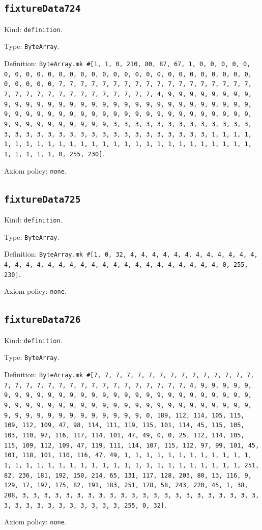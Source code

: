 \documentclass[11pt]{article}
\begin{document}
\subsection*{\texttt{fixtureData724}}
\noindent Kind: \texttt{definition}.\par
\noindent Type: \texttt{ByteArray}.\par
\noindent Definition: \texttt{ByteArray.mk \#[1, 1, 0, 210, 80, 87, 67, 1, 0, 0, 0, 0, 0, 0, 0, 0, 0, 0, 0, 0, 0, 0, 0, 0, 0, 0, 0, 0, 0, 0, 0, 0, 0, 0, 0, 0, 0, 0, 0, 0, 0, 7, 7, 7, 7, 7, 7, 7, 7, 7, 7, 7, 7, 7, 7, 7, 7, 7, 7, 7, 7, 7, 7, 7, 7, 7, 7, 7, 7, 7, 7, 7, 7, 4, 9, 9, 9, 9, 9, 9, 9, 9, 9, 9, 9, 9, 9, 9, 9, 9, 9, 9, 9, 9, 9, 9, 9, 9, 9, 9, 9, 9, 9, 9, 9, 9, 9, 9, 9, 9, 9, 9, 9, 9, 9, 9, 9, 9, 9, 9, 9, 9, 9, 9, 9, 9, 9, 9, 9, 9, 9, 9, 9, 9, 9, 9, 9, 9, 3, 3, 3, 3, 3, 3, 3, 3, 3, 3, 3, 3, 3, 3, 3, 3, 3, 3, 3, 3, 3, 3, 3, 3, 3, 3, 3, 3, 3, 3, 3, 3, 1, 1, 1, 1, 1, 1, 1, 1, 1, 1, 1, 1, 1, 1, 1, 1, 1, 1, 1, 1, 1, 1, 1, 1, 1, 1, 1, 1, 1, 1, 1, 1, 0, 255, 230]}.\par
\noindent Axiom policy: \texttt{none}.\par
\subsection*{\texttt{fixtureData725}}
\noindent Kind: \texttt{definition}.\par
\noindent Type: \texttt{ByteArray}.\par
\noindent Definition: \texttt{ByteArray.mk \#[1, 0, 32, 4, 4, 4, 4, 4, 4, 4, 4, 4, 4, 4, 4, 4, 4, 4, 4, 4, 4, 4, 4, 4, 4, 4, 4, 4, 4, 4, 4, 4, 4, 4, 4, 0, 255, 230]}.\par
\noindent Axiom policy: \texttt{none}.\par
\subsection*{\texttt{fixtureData726}}
\noindent Kind: \texttt{definition}.\par
\noindent Type: \texttt{ByteArray}.\par
\noindent Definition: \texttt{ByteArray.mk \#[7, 7, 7, 7, 7, 7, 7, 7, 7, 7, 7, 7, 7, 7, 7, 7, 7, 7, 7, 7, 7, 7, 7, 7, 7, 7, 7, 7, 7, 7, 7, 7, 4, 9, 9, 9, 9, 9, 9, 9, 9, 9, 9, 9, 9, 9, 9, 9, 9, 9, 9, 9, 9, 9, 9, 9, 9, 9, 9, 9, 9, 9, 9, 9, 9, 9, 9, 9, 9, 9, 9, 9, 9, 9, 9, 9, 9, 9, 9, 9, 9, 9, 9, 9, 9, 9, 9, 9, 9, 9, 9, 9, 9, 9, 9, 9, 9, 0, 189, 112, 114, 105, 115, 109, 112, 109, 47, 98, 114, 111, 119, 115, 101, 114, 45, 115, 105, 103, 110, 97, 116, 117, 114, 101, 47, 49, 0, 0, 25, 112, 114, 105, 115, 109, 112, 109, 47, 119, 111, 114, 107, 115, 112, 97, 99, 101, 45, 101, 118, 101, 110, 116, 47, 49, 1, 1, 1, 1, 1, 1, 1, 1, 1, 1, 1, 1, 1, 1, 1, 1, 1, 1, 1, 1, 1, 1, 1, 1, 1, 1, 1, 1, 1, 1, 1, 1, 1, 1, 251, 82, 236, 181, 192, 150, 214, 65, 131, 117, 128, 203, 80, 13, 116, 9, 129, 17, 197, 175, 82, 191, 183, 251, 178, 58, 243, 220, 45, 1, 38, 208, 3, 3, 3, 3, 3, 3, 3, 3, 3, 3, 3, 3, 3, 3, 3, 3, 3, 3, 3, 3, 3, 3, 3, 3, 3, 3, 3, 3, 3, 3, 3, 3, 3, 255, 0, 32]}.\par
\noindent Axiom policy: \texttt{none}.\par
\end{document}
